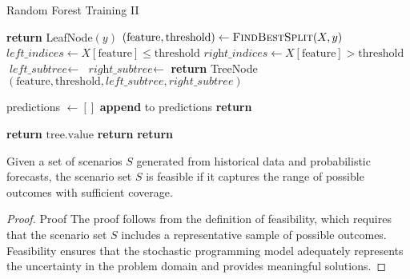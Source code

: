 \documentclass[ijds,sglanonrev]{informs4}
\begin{document}
\begin{algorithm}
\begin{algorithmic}[1]
\caption{Random Forest Training II}
        \State \textbf{return} LeafNode$(y)$
    \Else
        \State $(\text{feature}, \text{threshold}) \gets \textsc{FindBestSplit}(X, y)$
        \State $\textit{left\_indices} \gets X[\text{feature}] \leq \text{threshold}$
        \State $\textit{right\_indices} \gets X[\text{feature}] > \text{threshold}$
        \State $\textit{left\_subtree} \gets$ 
        \State $\textit{right\_subtree} \gets$ 
        \State \textbf{return} TreeNode$(\text{feature}, \text{threshold}, left\_subtree, right\_subtree)$
    \EndIf
\EndProcedure
\Statex

    \State predictions $\gets []$
        \State \textbf{append}  to predictions
    \EndFor
    \State \textbf{return} 
\EndProcedure
\Statex

        \State \textbf{return} $\text{tree.value}$
    \Else
            \State \textbf{return} 
        \Else
            \State \textbf{return} 
        \EndIf
    \EndIf
\EndProcedure
\end{algorithmic}
\end{algorithm}

\begin{lemma}\label{lem:FSS}
Given a set of scenarios $S$ generated from historical data and probabilistic forecasts, the scenario set $S$ is feasible if it captures the range of possible outcomes with sufficient coverage.
\end{lemma}

\begin{proof}{Proof}
The proof follows from the definition of feasibility, which requires that the scenario set $S$ includes a representative sample of possible outcomes. Feasibility ensures that the stochastic programming model adequately represents the uncertainty in the problem domain and provides meaningful solutions.\Halmos
\end{proof}
\end{document}
